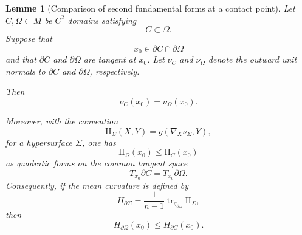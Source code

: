 \documentclass{article}
\renewcommand{\boxed}[1]{#1}
\newtheorem{lemma}[theorem]{Lemme}
\begin{document}
\begin{lemma}[Comparison of second fundamental forms at a contact point]
\label{lem:contact-curvature}
Let $C,\Omega\subset M$ be $C^2$ domains satisfying
\[
C\subset\Omega.
\]
Suppose that
\[
x_0\in\partial C\cap\partial\Omega
\]
and that $\partial C$ and $\partial\Omega$ are tangent at $x_0$.
Let $\nu_C$ and $\nu_\Omega$ denote the outward unit normals to
$\partial C$ and $\partial\Omega$, respectively.

Then
\begin{equation}
\nu_C(x_0)=\nu_\Omega(x_0).
\label{eq:normals-contact}
\end{equation}

Moreover, with the convention
\begin{equation}
\mathrm{II}_{\Sigma}(X,Y)
=
g(\nabla_X\nu_\Sigma,Y),
\label{eq:second-fundamental-form-contact}
\end{equation}
for a hypersurface $\Sigma$, one has
\begin{equation}
\mathrm{II}_{\Omega}(x_0)
\leq
\mathrm{II}_{C}(x_0)
\label{eq:II-contact}
\end{equation}
as quadratic forms on the common tangent space
\[
T_{x_0}\partial C=T_{x_0}\partial\Omega.
\]
Consequently, if the mean curvature is defined by
\begin{equation}
H_{\partial\Sigma}
=
\frac{1}{n-1}
\operatorname{tr}_{g_{\partial\Sigma}}
\mathrm{II}_{\Sigma},
\label{eq:mean-curvature-convention-contact}
\end{equation}
then
\begin{equation}
\boxed{
H_{\partial\Omega}(x_0)
\leq
H_{\partial C}(x_0).
}
\label{eq:mean-curvature-contact}
\end{equation}
\end{lemma}
\end{document}
